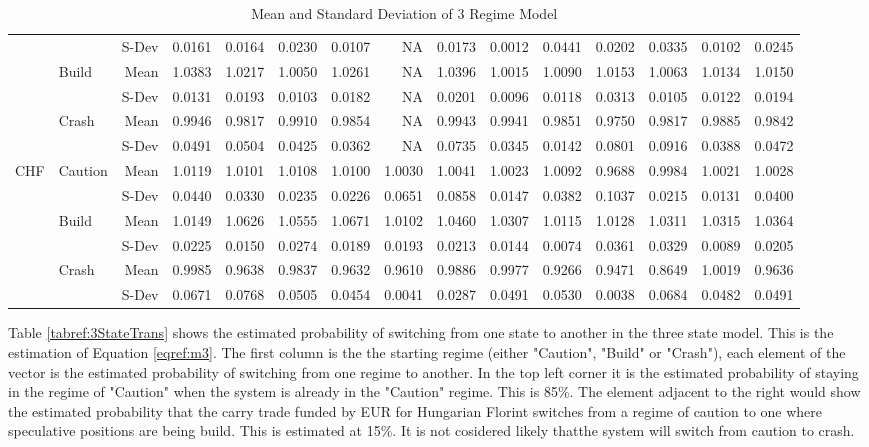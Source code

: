 \documentclass[12pt, a4paper, oneside]{article} %
\begin{document}
\begin{landscape}
\begin{table}[ht]
\begin{tabular}{llrrrrrrrrrrrrr}
  && S-Dev & 0.0161 & 0.0164 & 0.0230 & 0.0107 & NA & 0.0173 & 0.0012 & 0.0441 & 0.0202 & 0.0335 & 0.0102 & 0.0245\\ 
  & \multirow{2}{*}{Build} &  Mean & 1.0383 & 1.0217 & 1.0050 & 1.0261 & NA & 1.0396 & 1.0015 & 1.0090 & 1.0153 & 1.0063 & 1.0134 & 1.0150\\ 
  && S-Dev & 0.0131 & 0.0193 & 0.0103 & 0.0182 & NA & 0.0201 & 0.0096 & 0.0118 & 0.0313 & 0.0105 & 0.0122 & 0.0194\\ 
  & \multirow{2}{*}{Crash} & Mean & 0.9946 & 0.9817 & 0.9910 & 0.9854 & NA & 0.9943 & 0.9941 & 0.9851 & 0.9750 & 0.9817 & 0.9885 & 0.9842 \\ 
  &&S-Dev & 0.0491 & 0.0504 & 0.0425 & 0.0362 & NA & 0.0735 & 0.0345 & 0.0142 & 0.0801 & 0.0916 & 0.0388 & 0.0472\\ 
\hline
\multirow{6}{*}{CHF}& \multirow{2}{*}{Caution} & Mean & 1.0119 & 1.0101 & 1.0108 & 1.0100 & 1.0030 & 1.0041 & 1.0023 & 1.0092 & 0.9688 & 0.9984 & 1.0021 & 1.0028\\ 
  && S-Dev& 0.0440 & 0.0330 & 0.0235 & 0.0226 & 0.0651 & 0.0858 & 0.0147 & 0.0382 & 0.1037 & 0.0215 & 0.0131 & 0.0400\\ 
  & \multirow{2}{*}{Build} & Mean & 1.0149 & 1.0626 & 1.0555 & 1.0671 & 1.0102 & 1.0460 & 1.0307 & 1.0115 & 1.0128 & 1.0311 & 1.0315 & 1.0364\\ 
  && S-Dev & 0.0225 & 0.0150 & 0.0274 & 0.0189 & 0.0193 & 0.0213 & 0.0144 & 0.0074 & 0.0361 & 0.0329 & 0.0089 & 0.0205\\ 
  & \multirow{2}{*}{Crash} & Mean & 0.9985 & 0.9638 & 0.9837 & 0.9632 & 0.9610 & 0.9886 & 0.9977 & 0.9266 & 0.9471 & 0.8649 & 1.0019 & 0.9636 \\ 
  && S-Dev& 0.0671 & 0.0768 & 0.0505 & 0.0454 & 0.0041 & 0.0287 & 0.0491 & 0.0530 & 0.0038 & 0.0684 & 0.0482 & 0.0491\\ 
   \hline
\end{tabular}
\caption{Mean and Standard Deviation of 3 Regime Model}
\label{tabref:3StateProb}
\end{table}
\end{landscape}

Table \ref{tabref:3StateTrans} shows the estimated probability of switching from one state to another in the three state model.  This is the estimation of Equation \ref{eqref:m3}.  The first column is the  the starting regime (either "Caution", "Build" or "Crash"), each element of the vector is the estimated probability of switching from one regime to another. In the top left corner it is the estimated probability of staying in the regime of "Caution" when the system is already in the "Caution" regime.  This is 85\%.  The element adjacent to the right would show the estimated probability that the carry trade funded by EUR for Hungarian Florint switches from a regime of caution to one where speculative positions are being build.  This is estimated at 15\%.  It is not cosidered likely thatthe system will switch from caution to crash.  
\end{document}
